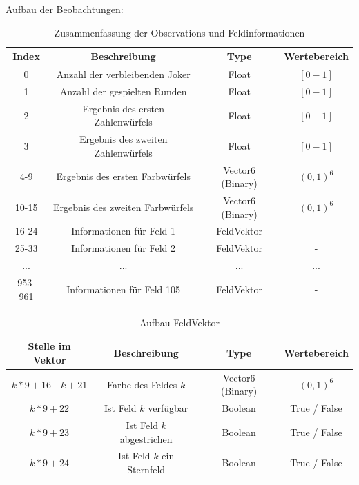 Aufbau der Beobachtungen:
\begin{table}[!htbp]
    \centering
    \begin{tabular}{|c|c|c|c|}
    \hline
    \textbf{Index} & \textbf{Beschreibung} & \textbf{Type} & \textbf{Wertebereich} \\
    \hline
    0 & Anzahl der verbleibenden Joker & Float & $[0 - 1]$ \\
    \hline
    1 & Anzahl der gespielten Runden & Float & $[0 - 1]$ \\
    \hline
    2 & Ergebnis des ersten Zahlenwürfels & Float & $[0 - 1]$ \\
    \hline
    3 & Ergebnis des zweiten Zahlenwürfels & Float & $[0 - 1]$ \\
    \hline
    4-9 & Ergebnis des ersten Farbwürfels & Vector6 (Binary) & $(0, 1)^6$ \\
    \hline
    10-15 & Ergebnis des zweiten Farbwürfels & Vector6 (Binary) & $(0, 1)^6$ \\
    \hline
    16-24 & Informationen für Feld 1 & FeldVektor & - \\
    \hline
    25-33 & Informationen für Feld 2 & FeldVektor & - \\
    \hline
    ... & ... & ... & ... \\
    \hline
    953-961 & Informationen für Feld 105 & FeldVektor & - \\
    \hline
    \end{tabular}
    \caption{Zusammenfassung der Observations und Feldinformationen}
    \label{tab:Aufbau Beobachtungen}
\end{table}
    
\begin{table}[!htbp]
    \centering
    \begin{tabular}{|c|c|c|c|}
    \hline
    \textbf{Stelle im Vektor} & \textbf{Beschreibung} & \textbf{Type} & \textbf{Wertebereich} \\
    \hline
    $k*9+16$ - $k+21$ & Farbe des Feldes $k$ & Vector6 (Binary) & $(0, 1)^6$ \\
    \hline
    $k*9+22$ & Ist Feld $k$ verfügbar & Boolean & True / False \\
    \hline
    $k*9+23$ & Ist Feld $k$ abgestrichen & Boolean & True / False \\
    \hline
    $k*9+24$ & Ist Feld $k$ ein Sternfeld & Boolean & True / False \\
    \hline
    \end{tabular}
    \caption{Aufbau FeldVektor}
    \label{tab:Aufbau Feldvektor}
\end{table}

